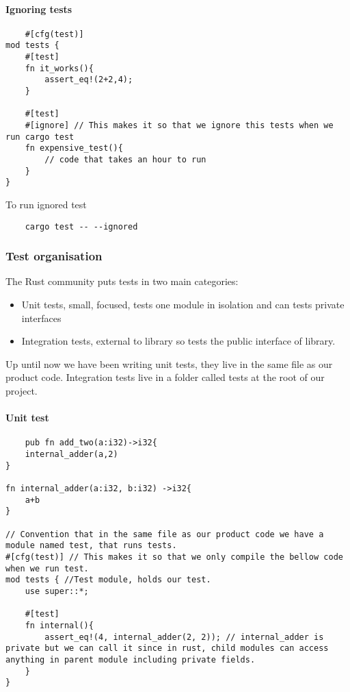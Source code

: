\paragraph{Ignoring tests}\begin{lstlisting}
    #[cfg(test)]
mod tests {
    #[test]
    fn it_works(){
        assert_eq!(2+2,4);
    }

    #[test]
    #[ignore] // This makes it so that we ignore this tests when we run cargo test
    fn expensive_test(){
        // code that takes an hour to run
    }
}
\end{lstlisting}


To run ignored test\begin{lstlisting}
    cargo test -- --ignored
\end{lstlisting}

\subsubsection{Test organisation}
\begin{definition}
    The Rust community puts tests in two main categories:
    \begin{itemize}
        \item Unit tests, small, focused, tests one module in isolation and can tests private interfaces
        \item Integration tests, external to library so tests the public interface of library.
    \end{itemize}    
Up until now we have been writing unit tests, they live in the same file as our product code. Integration tests live in a folder called tests at the root of our project.
\end{definition}

\paragraph*{Unit test}\begin{lstlisting}
    pub fn add_two(a:i32)->i32{
    internal_adder(a,2)
}

fn internal_adder(a:i32, b:i32) ->i32{
    a+b
}

// Convention that in the same file as our product code we have a module named test, that runs tests.
#[cfg(test)] // This makes it so that we only compile the bellow code when we run test.
mod tests { //Test module, holds our test.
    use super::*;

    #[test]
    fn internal(){
        assert_eq!(4, internal_adder(2, 2)); // internal_adder is private but we can call it since in rust, child modules can access anything in parent module including private fields.
    }
}
\end{lstlisting}

